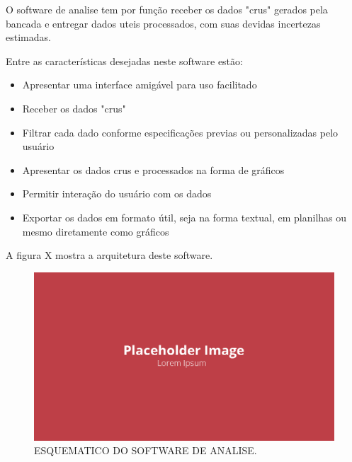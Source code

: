 O software de analise tem por função receber os dados "crus" gerados pela bancada e entregar dados uteis processados, com suas devidas incertezas estimadas.

Entre as características desejadas neste software estão:

\begin{itemize}
    \item Apresentar uma interface amigável para uso facilitado
    \item Receber os dados "crus"
    \item Filtrar cada dado conforme especificações previas ou personalizadas pelo usuário
    \item Apresentar os dados crus e processados na forma de gráficos
    \item Permitir interação do usuário com os dados
    \item Exportar os dados em formato útil, seja na forma textual, em planilhas ou mesmo diretamente como gráficos
\end{itemize}

A figura X mostra a arquitetura deste software.

\begin{figure}[!ht]
    \centering
    \includegraphics[width=.8\linewidth]{figuras/outras/placeholder.png}
    \caption{ESQUEMATICO DO SOFTWARE DE ANALISE\cite{autor}.}
    \label{fig:esquematico_software_analise}
\end{figure}
